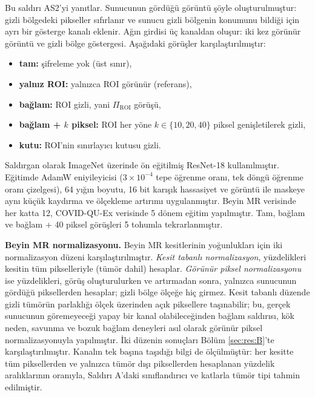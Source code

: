 Bu saldırı AS2'yi yanıtlar. Sunucunun gördüğü görüntü şöyle oluşturulmuştur: gizli bölgedeki pikseller sıfırlanır ve sunucu gizli bölgenin konumunu bildiği için ayrı bir gösterge kanalı eklenir. Ağın girdisi üç kanaldan oluşur: iki kez görünür görüntü ve gizli bölge göstergesi. Aşağıdaki görüşler karşılaştırılmıştır:

\begin{itemize}
\item \textbf{tam:} şifreleme yok (üst sınır),
\item \textbf{yalnız ROI:} yalnızca ROI görünür (referans),
\item \textbf{bağlam:} ROI gizli, yani $\Pi_{\mathrm{ROI}}$ görüşü,
\item \textbf{bağlam + $k$ piksel:} ROI her yöne $k \in \{10, 20, 40\}$ piksel genişletilerek gizli,
\item \textbf{kutu:} ROI'nin sınırlayıcı kutusu gizli.
\end{itemize}

Saldırgan olarak ImageNet \cite{deng2009imagenet} üzerinde ön eğitilmiş ResNet-18 \cite{he2016resnet} kullanılmıştır. Eğitimde AdamW eniyileyicisi \cite{loshchilov2019adamw} ($3 \times 10^{-4}$ tepe öğrenme oranı, tek döngü öğrenme oranı çizelgesi), 64 yığın boyutu, 16 bit karışık hassasiyet ve görüntü ile maskeye aynı küçük kaydırma ve ölçekleme artırımı uygulanmıştır. Beyin MR verisinde her katta 12, COVID-QU-Ex verisinde 5 dönem eğitim yapılmıştır. Tam, bağlam ve bağlam + 40 piksel görüşleri 5 tohumla tekrarlanmıştır.

\textbf{Beyin MR normalizasyonu.} Beyin MR kesitlerinin yoğunlukları için iki normalizasyon düzeni karşılaştırılmıştır. \emph{Kesit tabanlı normalizasyon}, yüzdelikleri kesitin tüm pikselleriyle (tümör dahil) hesaplar. \emph{Görünür piksel normalizasyonu} ise yüzdelikleri, görüş oluşturulurken ve artırmadan sonra, yalnızca sunucunun gördüğü piksellerden hesaplar; gizli bölge ölçeğe hiç girmez. Kesit tabanlı düzende gizli tümörün parlaklığı ölçek üzerinden açık piksellere taşınabilir; bu, gerçek sunucunun göremeyeceği yapay bir kanal olabileceğinden bağlam saldırısı, kök neden, savunma ve bozuk bağlam deneyleri asıl olarak görünür piksel normalizasyonuyla yapılmıştır. İki düzenin sonuçları Bölüm \ref{sec:res:B}'te karşılaştırılmıştır. Kanalın tek başına taşıdığı bilgi de ölçülmüştür: her kesitte tüm piksellerden ve yalnızca tümör dışı piksellerden hesaplanan yüzdelik aralıklarının oranıyla, Saldırı A'daki sınıflandırıcı ve katlarla tümör tipi tahmin edilmiştir.

